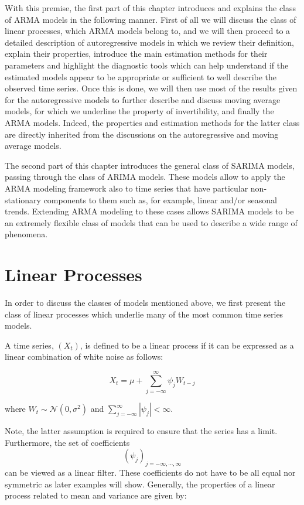 \documentclass[]{book}
\theoremstyle{definition}
\theoremstyle{definition}
\theoremstyle{definition}
\theoremstyle{remark}
\let\BeginKnitrBlock\begin \let\EndKnitrBlock\end
\begin{document}
With this premise, the first part of this chapter introduces and
explains the class of ARMA models in the following manner. First of all
we will discuss the class of linear processes, which ARMA models belong
to, and we will then proceed to a detailed description of autoregressive
models in which we review their definition, explain their properties,
introduce the main estimation methods for their parameters and highlight
the diagnostic tools which can help understand if the estimated models
appear to be appropriate or sufficient to well describe the observed
time series. Once this is done, we will then use most of the results
given for the autoregressive models to further describe and discuss
moving average models, for which we underline the property of
invertibility, and finally the ARMA models. Indeed, the properties and
estimation methods for the latter class are directly inherited from the
discussions on the autoregressive and moving average models.

The second part of this chapter introduces the general class of SARIMA
models, passing through the class of ARIMA models. These models allow to
apply the ARMA modeling framework also to time series that have
particular non-stationary components to them such as, for example,
linear and/or seasonal trends. Extending ARMA modeling to these cases
allows SARIMA models to be an extremely flexible class of models that
can be used to describe a wide range of phenomena.

\section{Linear Processes}\label{linear-processes}

In order to discuss the classes of models mentioned above, we first
present the class of linear processes which underlie many of the most
common time series models.

\BeginKnitrBlock{definition}[Linear Process]
\protect\hypertarget{def:lp}{}{\label{def:lp} {} }A time series, \((X_t)\), is defined to be a linear process if it
can be expressed as a linear combination of white noise as follows:

\[{X_t} = \mu + \sum\limits_{j =  - \infty }^\infty  {{\psi _j}{W_{t - j}}} \]

where \(W_t \sim \mathcal{N}(0, \sigma^2)\) and
\(\sum\limits_{j = - \infty }^\infty {\left| {{\psi _j}} \right|} < \infty\).
\EndKnitrBlock{definition}

Note, the latter assumption is required to ensure that the series has a
limit. Furthermore, the set of coefficients
\[{( {\psi _j}) _{j =  - \infty , \cdots ,\infty }}\] can be viewed as a
linear filter. These coefficients do not have to be all equal nor
symmetric as later examples will show. Generally, the properties of a
linear process related to mean and variance are given by:
\end{document}
